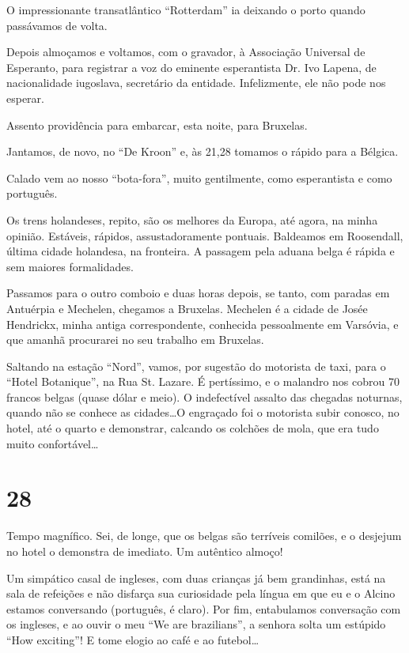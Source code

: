 O impressionante transatlântico “Rotterdam” ia deixando o porto quando passávamos de volta.

Depois almoçamos e voltamos, com o gravador, à Associação Universal de Esperanto, para registrar a voz do eminente esperantista Dr. Ivo Lapena, de nacionalidade iugoslava, secretário da entidade. Infelizmente, ele não pode nos esperar.

Assento providência para embarcar, esta noite, para Bruxelas.

Jantamos, de novo, no “De Kroon” e, às 21,28 tomamos o rápido para a Bélgica.

Calado vem ao nosso “bota-fora”, muito gentilmente, como esperantista e como português.

Os trens holandeses, repito, são os melhores da Europa, até agora, na minha opinião. Estáveis, rápidos, assustadoramente pontuais. Baldeamos em Roosendall, última cidade holandesa, na fronteira. A passagem pela aduana belga é rápida e sem maiores formalidades.

Passamos para o outro comboio e duas horas depois, se tanto, com paradas em Antuérpia e Mechelen, chegamos a Bruxelas. Mechelen é a cidade de Josée Hendrickx, minha antiga correspondente, conhecida pessoalmente em Varsóvia, e que amanhã procurarei no seu trabalho em Bruxelas.

Saltando na estação “Nord”, vamos, por sugestão do motorista de taxi, para o “Hotel Botanique”, na Rua St. Lazare. É pertíssimo, e o malandro nos cobrou 70 francos belgas (quase dólar e meio). O indefectível assalto das chegadas noturnas, quando não se conhece as cidades\ldots O engraçado foi o motorista subir conosco, no hotel, até o quarto e demonstrar, calcando os colchões de mola, que era tudo muito confortável\ldots

\section*{28 \adfflatleafright {}}
Tempo magnífico. Sei, de longe, que os belgas são terríveis comilões, e o desjejum no hotel o demonstra de imediato. Um autêntico almoço!

Um simpático casal de ingleses, com duas crianças já bem grandinhas, está na sala de refeições e não disfarça sua curiosidade pela língua em que eu e o Alcino estamos conversando (português, é claro). Por fim, entabulamos conversação com os ingleses, e ao ouvir o meu “We are brazilians”, a senhora solta um estúpido “How exciting”! E tome elogio ao café e ao futebol\ldots

